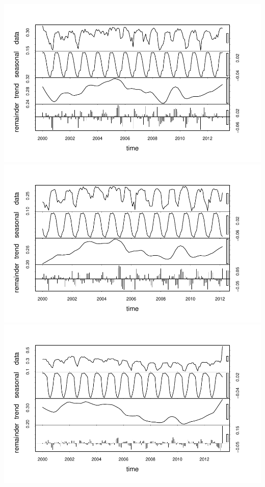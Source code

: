 \documentclass[
  12pt,
]{article}
\begin{document}
\includegraphics{Project_Template_files/figure-latex/TSA-1.pdf}
\includegraphics{Project_Template_files/figure-latex/TSA-2.pdf}
\includegraphics{Project_Template_files/figure-latex/TSA-3.pdf}
\end{document}
